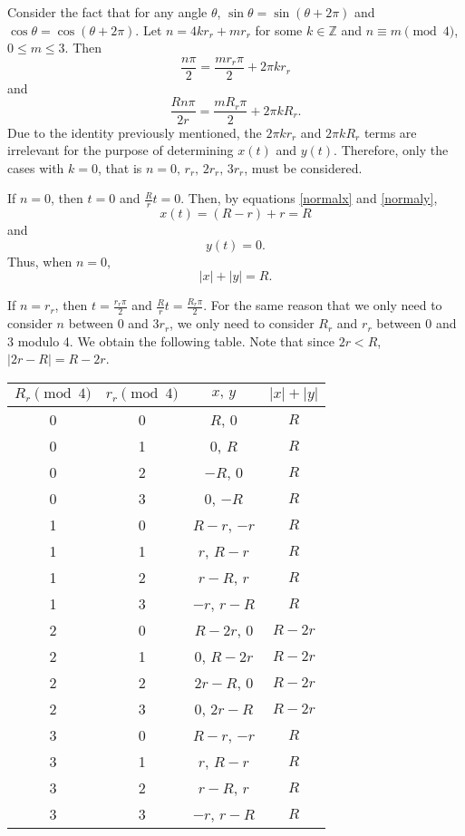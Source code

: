 \documentclass[12pt]{article}
\begin{document}
Consider the fact that for any angle $\theta$, $\sin\theta = \sin(\theta + 2\pi)$ and $\cos\theta = \cos(\theta + 2\pi)$. Let $n = 4kr_r + mr_r$ for some $k \in \mathbb{Z}$ and $n \equiv m \pmod 4$, $0 \le m \le 3$. Then \[ \frac{n\pi}{2} = \frac{mr_r\pi}{2} + 2\pi kr_r \] and \[ \frac{Rn\pi}{2r} = \frac{mR_r\pi}{2} + 2\pi kR_r. \] Due to the identity previously mentioned, the $2\pi kr_r$ and $2\pi kR_r$ terms are irrelevant for the purpose of determining $x(t)$ and $y(t)$. Therefore, only the cases with $k = 0$, that is $n = 0,\,r_r,\,2r_r,\,3r_r$, must be considered.

If $n = 0$, then $t = 0$ and $\frac{R}{r} t = 0$. Then, by equations \ref{normalx} and \ref{normaly}, \[ x(t) = (R - r) + r = R \] and \[ y(t) = 0. \] Thus, when $n = 0$, \[ |x| + |y| = R. \]

If $n = r_r$, then $t = \frac{r_r\pi}{2}$ and $\frac{R}{r} t = \frac{R_r\pi}{2}$. For the same reason that we only need to consider $n$ between 0 and $3r_r$, we only need to consider $R_r$ and $r_r$ between 0 and 3 modulo 4. We obtain the following table. Note that since $2r < R$, $|2r - R| = R - 2r$.

\begin{center}
\begin{tabular}{c|c|c|c}
  $R_r \pmod 4$ & $r_r \pmod 4$ & $x,\,y$ & $|x| + |y|$ \\ \hline
  0 & 0 & $R$, 0 & $R$ \\
  0 & 1 & 0, $R$ & $R$ \\
  0 & 2 & $-R$, 0 & $R$ \\
  0 & 3 & 0, $-R$ & $R$ \\ \hline
  1 & 0 & $R - r$, $-r$ & $R$ \\
  1 & 1 & $r$, $R - r$ & $R$ \\
  1 & 2 & $r - R$, $r$ & $R$ \\
  1 & 3 & $-r$, $r - R$ & $R$ \\ \hline
  2 & 0 & $R - 2r$, 0 & $R - 2r$ \\
  2 & 1 & 0, $R - 2r$ & $R - 2r$ \\
  2 & 2 & $2r - R$, 0 & $R - 2r$ \\ 
  2 & 3 & 0, $2r - R$ & $R - 2r$ \\ \hline
  3 & 0 & $R - r$, $-r$ & $R$ \\
  3 & 1 & $r$, $R - r$ & $R$ \\
  3 & 2 & $r - R$, $r$ & $R$ \\
  3 & 3 & $-r$, $r - R$ & $R$ \\
\end{tabular}
\end{center}
\end{document}
